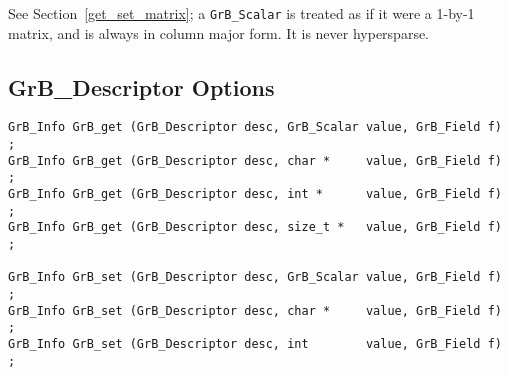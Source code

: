 See Section~\ref{get_set_matrix}; a \verb'GrB_Scalar' is treated as if it were
a 1-by-1 matrix, and is always in column major form.  It is never hypersparse.

\newpage
\subsection{{\sf GrB\_Descriptor} Options}
\label{get_set_descriptor}

\begin{mdframed}[userdefinedwidth=6in]
{\footnotesize
\begin{verbatim}
GrB_Info GrB_get (GrB_Descriptor desc, GrB_Scalar value, GrB_Field f) ;
GrB_Info GrB_get (GrB_Descriptor desc, char *     value, GrB_Field f) ;
GrB_Info GrB_get (GrB_Descriptor desc, int *      value, GrB_Field f) ;
GrB_Info GrB_get (GrB_Descriptor desc, size_t *   value, GrB_Field f) ;

GrB_Info GrB_set (GrB_Descriptor desc, GrB_Scalar value, GrB_Field f) ;
GrB_Info GrB_set (GrB_Descriptor desc, char *     value, GrB_Field f) ;
GrB_Info GrB_set (GrB_Descriptor desc, int        value, GrB_Field f) ;
\end{verbatim}
}\end{mdframed}

